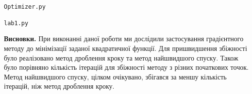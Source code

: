 \documentclass{extreport}
\begin{document}
\noindent\texttt{Optimizer.py}


\noindent\texttt{lab1.py}


\noindent\textbf{Висновки.} При виконанні даної роботи ми дослідили
застосування градієнтного методу до мінімізації заданої квадратичної функції.
Для пришвидшення збіжності
було реалізовано метод дроблення кроку та метод найшвидшого спуску. Також було порівняно
кількість ітерацій для збіжності методу з різних початкових точок. Метод найшвидшого спуску, цілком очікувано,
збігався за меншу кількість ітерацій, ніж метод дроблення кроку.
\end{document}
